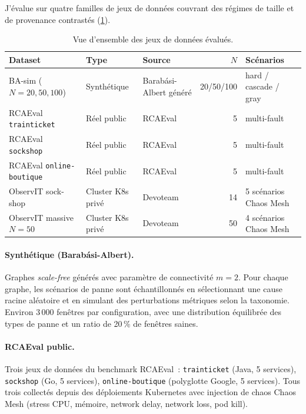 \documentclass[a4paper,11pt,oneside]{report}
\begin{document}
J'\'evalue sur quatre familles de jeux de donn\'ees couvrant des r\'egimes de taille et de provenance contrast\'es (\cref{tab:datasets}).

\begin{table}[ht]
\centering
\caption{Vue d'ensemble des jeux de donn\'ees \'evalu\'es.}
\label{tab:datasets}
\begin{tabular}{lllrl}
\toprule
Dataset & Type & Source & $N$ & Sc\'enarios \\
\midrule
BA-sim ($N{=}20,50,100$) & Synth\'etique & Barab\'asi-Albert g\'en\'er\'e & 20/50/100 & hard / cascade / gray \\
RCAEval \texttt{trainticket} & R\'eel public & RCAEval & 5 & multi-fault \\
RCAEval \texttt{sockshop} & R\'eel public & RCAEval & 5 & multi-fault \\
RCAEval \texttt{online-boutique} & R\'eel public & RCAEval & 5 & multi-fault \\
ObservIT sock-shop & Cluster K8s priv\'e & Devoteam & 14 & 5 sc\'enarios Chaos Mesh \\
ObservIT massive $N{=}50$ & Cluster K8s priv\'e & Devoteam & 50 & 4 sc\'enarios Chaos Mesh \\
\bottomrule
\end{tabular}
\end{table}

\paragraph{Synth\'etique (Barab\'asi-Albert).} Graphes \emph{scale-free} g\'en\'er\'es avec param\`etre de connectivit\'e $m{=}2$. Pour chaque graphe, les sc\'enarios de panne sont \'echantillonn\'es en s\'electionnant une cause racine al\'eatoire et en simulant des perturbations m\'etriques selon la taxonomie. Environ 3\,000 fen\^etres par configuration, avec une distribution \'equilibr\'ee des types de panne et un ratio de 20\,\% de fen\^etres saines.

\paragraph{RCAEval public.} Trois jeux de donn\'ees du benchmark RCAEval~: \texttt{trainticket} (Java, 5 services), \texttt{sockshop} (Go, 5 services), \texttt{online-boutique} (polyglotte Google, 5 services). Tous trois collect\'es depuis des d\'eploiements Kubernetes avec injection de chaos Chaos Mesh (stress CPU, m\'emoire, network delay, network loss, pod kill).
\end{document}
